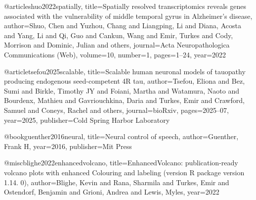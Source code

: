 @article{shuo2022spatially,
  title={Spatially resolved transcriptomics reveals genes associated with the vulnerability of middle temporal gyrus in Alzheimer’s disease},
  author={Shuo, Chen and Yuzhou, Chang and Liangping, Li and Diana, Acosta and Yang, Li and Qi, Guo and Cankun, Wang and Emir, Turkes and Cody, Morrison and Dominic, Julian and others},
  journal={Acta Neuropathologica Communications (Web)},
  volume={10},
  number={1},
  pages={1--24},
  year={2022}
}

@article{tsefou2025scalable,
  title={Scalable human neuronal models of tauopathy producing endogenous seed-competent 4R tau},
  author={Tsefou, Eliona and Bez, Sumi and Birkle, Timothy JY and Foiani, Martha and Watamura, Naoto and Bourdenx, Mathieu and Gavriouchkina, Daria and Turkes, Emir and Crawford, Samuel and Coneys, Rachel and others},
  journal={bioRxiv},
  pages={2025--07},
  year={2025},
  publisher={Cold Spring Harbor Laboratory}
}

@book{guenther2016neural,
  title={Neural control of speech},
  author={Guenther, Frank H},
  year={2016},
  publisher={Mit Press}
}

@misc{blighe2022enhancedvolcano,
  title={EnhancedVolcano: publication-ready volcano plots with enhanced Colouring and labeling (version R package version 1.14. 0)},
  author={Blighe, Kevin and Rana, Sharmila and Turkes, Emir and Ostendorf, Benjamin and Grioni, Andrea and Lewis, Myles},
  year={2022}
}
